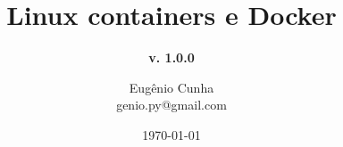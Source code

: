
\title[] %
{ %
      \textbf{Linux containers e Docker}
}

\subtitle[Linux containers e Docker]
{
      \textbf{v. 1.0.0}
}

\author[Eugênio Cunha]
{      Eugênio Cunha \\
      {\ttfamily genio.py@gmail.com}
}

\institute[]
{

}

\date{\today}